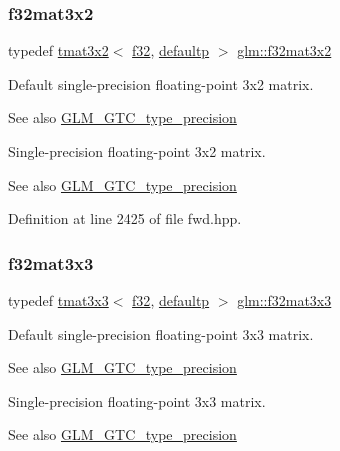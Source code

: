 \subsubsection{\texorpdfstring{f32mat3x2}{f32mat3x2}}
{\footnotesize\ttfamily typedef \mbox{\hyperlink{structglm_1_1tmat3x2}{tmat3x2}}$<$ \mbox{\hyperlink{group__gtc__type__precision_ga0ec999b57f5330d9021256e96038df04}{f32}}, \mbox{\hyperlink{namespaceglm_a0f04f086094c747d227af4425893f545a9d21ccd8b5a009ec7eb7677befc3bf51}{defaultp}} $>$ \mbox{\hyperlink{group__gtc__type__precision_ga61653615c76194cdf3454e6e703525e0}{glm\+::f32mat3x2}}}

Default single-\/precision floating-\/point 3x2 matrix. \begin{DoxySeeAlso}{See also}
\mbox{\hyperlink{group__gtc__type__precision}{G\+L\+M\+\_\+\+G\+T\+C\+\_\+type\+\_\+precision}}
\end{DoxySeeAlso}
Single-\/precision floating-\/point 3x2 matrix. \begin{DoxySeeAlso}{See also}
\mbox{\hyperlink{group__gtc__type__precision}{G\+L\+M\+\_\+\+G\+T\+C\+\_\+type\+\_\+precision}} 
\end{DoxySeeAlso}


Definition at line 2425 of file fwd.\+hpp.

\mbox{\label{group__gtc__type__precision_ga715b36ea1e2d1ffaaef7517cc78b3877}} 
\subsubsection{\texorpdfstring{f32mat3x3}{f32mat3x3}}
{\footnotesize\ttfamily typedef \mbox{\hyperlink{structglm_1_1tmat3x3}{tmat3x3}}$<$ \mbox{\hyperlink{group__gtc__type__precision_ga0ec999b57f5330d9021256e96038df04}{f32}}, \mbox{\hyperlink{namespaceglm_a0f04f086094c747d227af4425893f545a9d21ccd8b5a009ec7eb7677befc3bf51}{defaultp}} $>$ \mbox{\hyperlink{group__gtc__type__precision_ga715b36ea1e2d1ffaaef7517cc78b3877}{glm\+::f32mat3x3}}}

Default single-\/precision floating-\/point 3x3 matrix. \begin{DoxySeeAlso}{See also}
\mbox{\hyperlink{group__gtc__type__precision}{G\+L\+M\+\_\+\+G\+T\+C\+\_\+type\+\_\+precision}}
\end{DoxySeeAlso}
Single-\/precision floating-\/point 3x3 matrix. \begin{DoxySeeAlso}{See also}
\mbox{\hyperlink{group__gtc__type__precision}{G\+L\+M\+\_\+\+G\+T\+C\+\_\+type\+\_\+precision}} 
\end{DoxySeeAlso}


